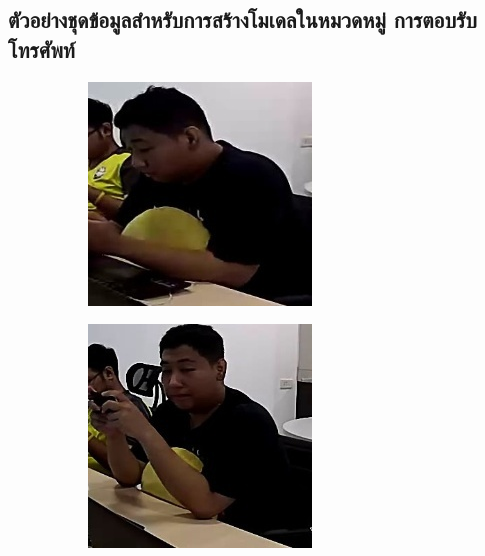 \subsection*{ตัวอย่างชุดข้อมูลสำหรับการสร้างโมเดลในหมวดหมู่ การตอบรับโทรศัพท์}
\begin{figure}[!ht]
    \centering
   \begin{subfigure}[b]{0.45\linewidth}
      \includegraphics[width=\linewidth]{appendix/answer_phone/000_CXS0_D0_000038.jpg}
    \end{subfigure}
    \begin{subfigure}[b]{0.45\linewidth}
      \includegraphics[width=\linewidth]{appendix/answer_phone/000_CXS0_D0_001102.jpg}

\end{subfigure}
\end{figure}
